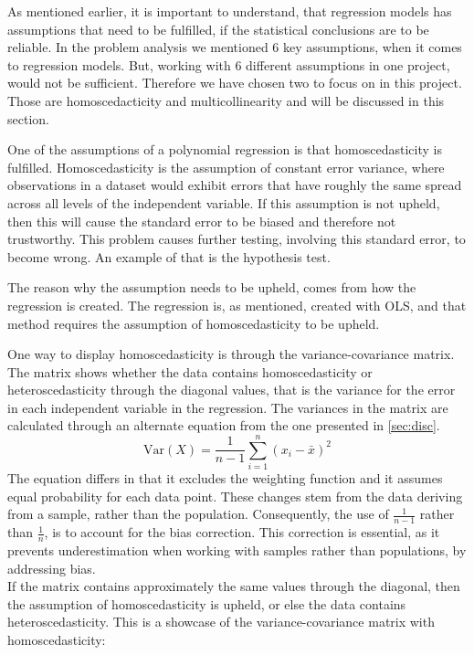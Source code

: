 As mentioned earlier, it is important to understand, that regression models has assumptions that need to be fulfilled, if the statistical conclusions are to be reliable. In the problem analysis we mentioned 6 key assumptions, when it comes to regression models. But, working with 6 different assumptions in one project, would not be sufficient. Therefore we have chosen two to focus on in this project. Those are homoscedacticity and multicollinearity and will be discussed in this section. \newline 

One of the assumptions of a polynomial regression is that homoscedasticity is fulfilled. Homoscedasticity is the assumption of constant error variance, where observations in a dataset would exhibit errors that have roughly the same spread across all levels of the independent variable. If this assumption is not upheld, then this will cause the standard error to be biased and therefore not trustworthy. This problem causes further testing, involving this standard error, to become wrong. An example of that is the hypothesis test.\newline

\noindent The reason why the assumption needs to be upheld, comes from how the regression is created. The regression is, as mentioned, created with OLS, and that method requires the assumption of homoscedasticity to be upheld.\newline

\noindent One way to display homoscedasticity is through the variance-covariance matrix. The matrix shows whether the data contains homoscedasticity or heteroscedasticity through the diagonal values, that is the variance for the error in each independent variable in the regression. The variances in the matrix are calculated through an alternate equation from the one presented in \autoref{sec:disc}.
\begin{equation}
	\text{Var}(X) = \frac{1}{n - 1} \sum_{i=1}^{n} (x_i - \bar{x})^2
\end{equation}
The equation differs in that it excludes the weighting function and it assumes equal probability for each data point. These changes stem from the data deriving from a sample, rather than the population. Consequently, the use of $\frac{1}{n-1}$ rather than $\frac{1}{n}$, is to account for the bias correction. This correction is essential, as it prevents underestimation when working with samples rather than populations, by addressing bias.\\
If the matrix contains approximately the same values through the diagonal, then the assumption of homoscedasticity is upheld, or else the data contains heteroscedasticity. This is a showcase of the variance-covariance matrix with homoscedasticity:



